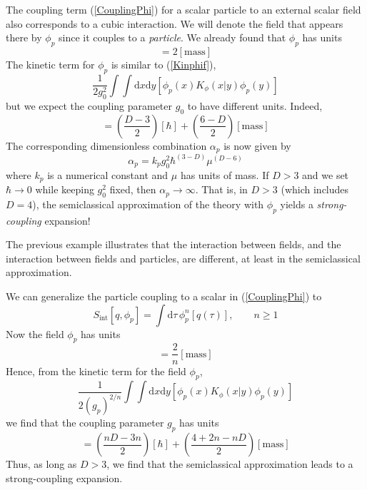 The coupling term (\ref{CouplingPhi}) for a scalar particle to an external scalar field also corresponds to a cubic interaction. We will denote the field that appears there by $\phi_{p}$ since it couples to a \textit{particle}. We already found that $\phi_{p}$ has units
\begin{equation}
	[\phi_{p}] = 2[ \text{mass} ]
\end{equation}
The kinetic term for $\phi_{p}$ is similar to (\ref{Kinphif}),
\begin{equation}
	\frac{1}{2g^{2}_{0}} \int \int \mathrm{d}x \mathrm{d}y \left[ \phi_{p}(x) K_{\phi}(x|y) \phi_{p}(y)  \right]
\end{equation}
but we expect the coupling parameter $g_{0}$ to have different units. Indeed,
\begin{equation}
	[g_{0}] = \left( \frac{D - 3}{2} \right) [\hbar] + \left( \frac{6 - D}{2} \right) [\text{mass}]
\end{equation}
The corresponding dimensionless combination $\alpha_{p}$ is now given by
\begin{equation}
	\alpha_{p} = k_{p} g_{0}^{2} \hbar^{(3 - D)} \mu^{(D - 6)}
\end{equation}
where $k_{p}$ is a numerical constant and $\mu$ has units of mass. If $D > 3$ and we set $\hbar \rightarrow 0$ while keeping $g_{0}^{2}$ fixed, then $\alpha_{p} \rightarrow \infty$. That is, in $D > 3$ (which includes $D = 4$), the semiclassical approximation of the theory with $\phi_{p}$ yields a \textit{strong-coupling} expansion!

The previous example illustrates that the interaction between fields, and the interaction between fields and particles, are different, at least in the semiclassical approximation.

We can generalize the particle coupling to a scalar in (\ref{CouplingPhi}) to
\begin{equation}
	S_{\text{int}}[q, \phi_{p}] = \int \mathrm{d}\tau \, \phi^{n}_{p}[q(\tau)], \qquad n \geq 1
\end{equation}
Now the field $\phi_{p}$ has units
\begin{equation}
	[\phi_{p}] = \frac{2}{n} [\text{mass}]
\end{equation}
Hence, from the kinetic term for the field $\phi_{p}$,
\begin{equation}
	\frac{1}{2(g_{p})^{2/n}} \int \int \mathrm{d}x \mathrm{d}y \left[ \phi_{p}(x) K_{\phi}(x|y) \phi_{p}(y)  \right]
\end{equation}
we find that the coupling parameter $g_{p}$ has units
\begin{equation}
	[g_{p}] = \left( \frac{nD - 3n}{2} \right) [\hbar] + \left( \frac{4 + 2n - nD}{2} \right) [\text{mass}]
\end{equation}
Thus, as long as $D > 3$, we find that the semiclassical approximation leads to a strong-coupling expansion.

